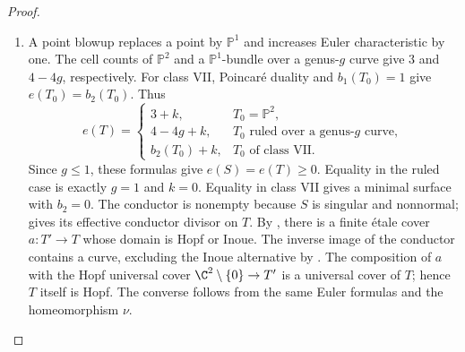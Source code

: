 \begin{proof}
\begin{enumerate}[label=\arabic*.,leftmargin=*]
\item A point blowup replaces a point by $\mathbb P^1$ and
increases Euler characteristic by one. The cell counts of
$\mathbb P^2$ and a $\mathbb P^1$-bundle over a genus-$g$
curve give $3$ and $4-4g$, respectively. For class VII,
Poincar\'e duality and $b_1(T_0)=1$ give $e(T_0)=b_2(T_0)$.
Thus
\[
 e(T)=\begin{cases}
 3+k,&T_0=\mathbb P^2,\\
 4-4g+k,&T_0\text{ ruled over a genus-}g\text{ curve},\\
 b_2(T_0)+k,&T_0\text{ of class VII}.
 \end{cases}
\]
Since $g\le1$, these formulas give
$e(S)=e(T)\ge0$. Equality in the ruled case is exactly
$g=1$ and $k=0$. Equality in class VII gives a minimal surface with
$b_2=0$. The conductor is nonempty because $S$ is singular
and nonnormal;  gives its effective
conductor divisor on $T$. By \cite[Theorem~1, p.~1]{BBK2019},
there is a finite \'etale cover $a:T'\to T$ whose domain is
Hopf or Inoue. The inverse image of the conductor contains
a curve, excluding the Inoue alternative by
\cite[Propositions~2(i) and~3(i), pp.~274--275 and~277,
and the paragraph after (21), p.~279]{Inoue1974}.
The composition of $a$ with the Hopf universal cover
$\C^2\setminus\{0\}\to T'$ is a universal cover of $T$;
hence $T$ itself is Hopf. The converse follows from the same Euler
formulas and the homeomorphism $\nu$.

\end{enumerate}
\end{proof}